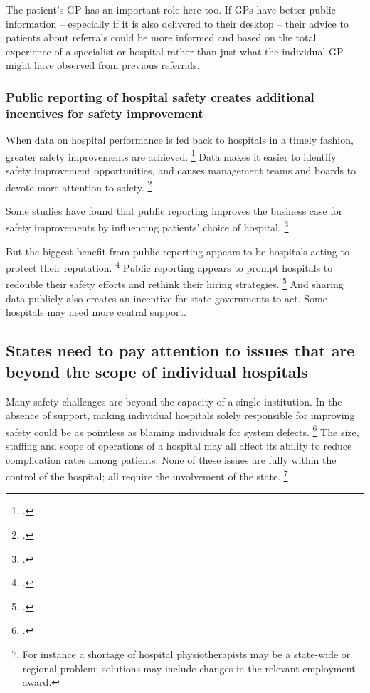 \documentclass[FrontPage]{grattan}
\begin{document}
The patient's GP has an important role here too.
If GPs have better public information -- especially if it is also delivered to their desktop -- their advice to patients about referrals could be more informed and based on the total experience of a specialist or hospital rather than just what the individual GP might have observed from previous referrals.

\subsubsection{Public reporting of hospital safety creates additional incentives for safety improvement}\label{subsubsec:public-reporting-of-hospital-safety-creates-additional-incentives-for-safety-improvement}

When data on hospital performance is fed back to hospitals in a timely fashion, greater safety improvements are achieved.%
	\footcite{Hibbard_2005}
Data makes it easier to identify safety improvement opportunities, and causes management teams and boards to devote more attention to safety.%
	\footcite{Tsai_2015}

Some studies have found that public reporting improves the business case for safety improvements by influencing patients' choice of hospital.%
	\footcite{Chandra_2016}

But the biggest benefit from public reporting appears to be hospitals acting to protect their reputation.%
	\footcites{frlich2007behavioral}{totten2012closing}
Public reporting appears to prompt hospitals to redouble their safety efforts and rethink their hiring strategies.%
	\footcites{Mukamel_2002}{Mukamel_2014}{Chassin_2002}{fung2008systematic}
And sharing data publicly also creates an incentive for state governments to act.
Some hospitals may need more central support.

\subsection{States need to pay attention to issues that are beyond the scope of individual hospitals }\label{subsec:states-need-to-pay-attention-to-issues-that-are-beyond-the-scope-of-individual-hospitals}

Many safety challenges are beyond the capacity of a single institution.
In the absence of support, making individual hospitals solely responsible for improving safety could be as pointless as blaming individuals for system defects.%
	\footcite{dixonwoods2016patient}
The size, staffing and scope of operations of a hospital may all affect its ability to reduce complication rates among patients.
None of these issues are fully within the control of the hospital; all require the involvement of the state.%
	\footnote{For instance a shortage of hospital physiotherapists may be a state-wide or regional problem; solutions may include changes in the relevant employment award.}
\end{document}
